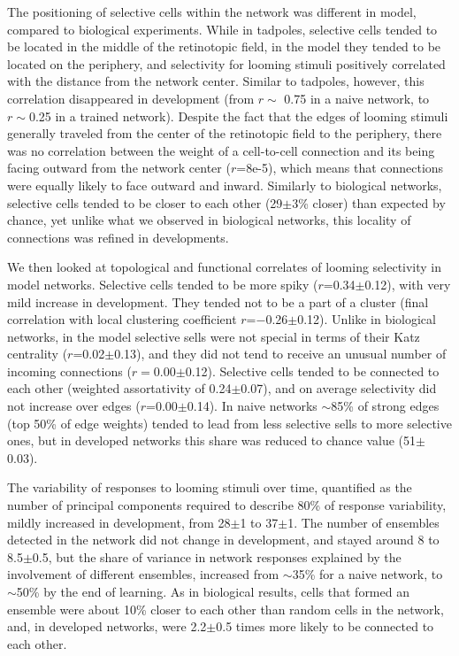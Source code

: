 \documentclass{article}
\begin{document}
The positioning of selective cells within the network was different in model, compared to biological experiments. While in tadpoles, selective cells tended to be located in the middle of the retinotopic field, in the model they tended to be located on the periphery, and selectivity for looming stimuli positively correlated with the distance from the network center. Similar to tadpoles, however, this correlation disappeared in development (from $r\sim$ 0.75 in a naive network, to $r\sim$0.25 in a trained network). Despite the fact that the edges of looming stimuli generally traveled from the center of the retinotopic field to the periphery, there was no correlation between the weight of a cell-to-cell connection and its being facing outward from the network center ($r$=8e-5), which means that connections were equally likely to face outward and inward. Similarly to biological networks, selective cells tended to be closer to each other (29$\pm$3\% closer) than expected by chance, yet unlike what we observed in biological networks, this locality of connections was refined in developments.

We then looked at topological and functional correlates of looming selectivity in model networks. Selective cells tended to be more spiky ($r$=0.34$\pm$0.12), with very mild increase in development. They tended not to be a part of a cluster (final correlation with local clustering coefficient $r$=$-$0.26$\pm$0.12). Unlike in biological networks, in the model selective sells were not special in terms of their Katz centrality ($r$=0.02$\pm$0.13), and they did not tend to receive an unusual number of incoming connections ($r=$0.00$\pm$0.12). Selective cells tended to be connected to each other (weighted assortativity of 0.24$\pm$0.07), and on average selectivity did not increase over edges ($r$=0.00$\pm$0.14). In naive networks $\sim$85\% of strong edges (top 50\% of edge weights) tended to lead from less selective sells to more selective ones, but in developed networks this share was reduced to chance value (51$\pm$0.03).

The variability of responses to looming stimuli over time, quantified as the number of principal components required to describe 80\% of response variability, mildly increased in development, from 28$\pm$1 to 37$\pm$1. The number of ensembles detected in the network did not change in development, and stayed around 8 to 8.5$\pm$0.5, but the share of variance in network responses explained by the involvement of different ensembles, increased from $\sim$35\% for a naive network, to $\sim$50\% by the end of learning. As in biological results, cells that formed an ensemble were about 10\% closer to each other than random cells in the network, and, in developed networks, were 2.2$\pm$0.5 times more likely to be connected to each other.
\end{document}
